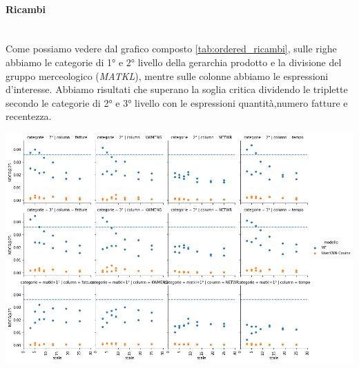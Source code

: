 \paragraph{Ricambi}\mbox{} \\
Come possiamo vedere dal grafico composto \ref{tab:ordered_ricambi}, sulle righe abbiamo le categorie di 1° e 2° livello della gerarchia prodotto e la divisione del gruppo merceologico (\textit{MATKL}), mentre sulle colonne abbiamo le espressioni d'interesse. Abbiamo risultati che superano la soglia critica dividendo le triplette secondo le categorie di 2° e 3° livello con le espressioni quantità,numero fatture e recentezza.
\begin{center}
    \includegraphics[width=16cm]{figures/risultati_ordered_categoria_ricambi.png}
    \label{tab:ordered_ricambi}
\end{center}
